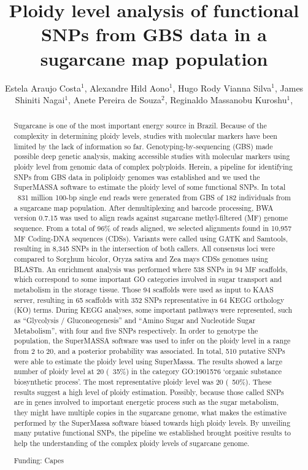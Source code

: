 \documentclass[twoside]{article}
\title{\vspace{-15mm}\fontsize{24pt}{10pt}\selectfont\textbf{ Ploidy level analysis of functional SNPs from GBS data in a sugarcane map population }} %
\author{ Estela Araujo Costa$^{1}$, Alexandre Hild Aono$^{1}$, Hugo Rody Vianna Silva$^{1}$, James Shiniti Nagai$^{1}$, Anete Pereira de Souza$^{2}$, Reginaldo Massanobu Kuroshu$^{1}$, }
\affil{ 1 Universidade Federal de São Paulo

2 Universidade Estadual de Campinas

 }
\date{}
\begin{document}
  
  
  \maketitle %
  
  
  \thispagestyle{fancy} %
  
  
  \begin{abstract}
  Sugarcane is one of the most important energy source in Brazil.  Because of the complexity in determining ploidy levels, studies with molecular markers have been limited by the lack of information so far. Genotyping-by-sequencing (GBS) made possible deep genetic analysis, making accessible studies with molecular markers using ploidy level from genomic data of complex polyploids. Herein, a pipeline for identifying SNPs from GBS data in poliploidy genomes was established and we used the SuperMASSA software to estimate the ploidy level of some functional SNPs. In total ~831 million 100-bp single end reads were generated from GBS of 182 individuals from a sugarcane map population. After demultiplexing and barcode processing, BWA version 0.7.15 was used to align reads against sugarcane methyl-filtered (MF) genome sequence. From a total of 96\% of reads aligned, we selected alignments found in 10,957 MF Coding-DNA sequences (CDSs). Variants were called using GATK and Samtools, resulting in 8,345 SNPs in the intersection of both callers. All consensus loci were compared to Sorghum bicolor, Oryza sativa and Zea mays CDSs genomes using BLASTn. An enrichment analysis was performed where 538 SNPs in 94 MF scaffolds, which correspond to some important GO categories involved in sugar transport and metabolism in the storage tissue. Those 94 scaffolds were used as input to KAAS server, resulting in 65 scaffolds with 352 SNPs representative in 64 KEGG orthology (KO) terms. During KEGG analyses, some important pathways were represented, such as “Glycolysis / Gluconeogenesis” and “Amino Sugar and Nucleotide Sugar Metabolism”, with four and five SNPs respectively. In order to genotype the population, the SuperMASSA software was used to infer on the ploidy level in a range from 2 to 20, and a posterior probability was associated. In total, 510 putative SNPs were able to estimate the ploidy level using SuperMassa. The results showed a large number of ploidy level at 20 (~35\%) in the category GO:1901576 ‘organic substance biosynthetic process’. The most representative ploidy level was 20 (~50\%). These results suggest a high level of ploidy estimation. Possibly, because those called SNPs are in genes involved to important energetic process such as the sugar metabolism, they might have multiple copies in the sugarcane genome, what makes the estimative performed by the SuperMassa software biased towards high ploidy levels. By unveiling many putative functional SNPs, the pipeline we established brought positive results to help the understanding of the complex ploidy levels of sugarcane genome.
  
  Funding: Capes \\ 
  \end{abstract}
  
\end{document}
